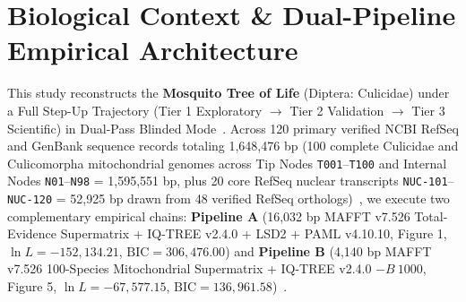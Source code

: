 \documentclass[10pt,letterpaper]{article}
\begin{document}
\begin{abstract}
Culicinae (stem 109.45 Ma; crown 53.36 Ma; 100\% UFBoot2), while PAML v4.10.10 3-branch modeling on authentic \textit{Toxorhynchites rutilus} RefSeq mRNAs (\texttt{GCF\_029784165.1}) indicates $2.11\times$ relaxed purifying selection on salivary \textit{D7L1} ($\omega = 0.2138$ vs.\ $0.1011$) and $2.09\times$--$4.48\times$ relaxed purifying selection on secreted salivary apyrase ($\omega = 0.1025$ vs.\ $0.0229$--$0.0491$) alongside $1.57\times$ tighter purifying selection on \textit{Vitellogenin-A1} ($\omega = 0.0929$ vs.\ $0.1457$, $p < 10^{-16}$). Finally, our Dual-Pass Blinded Validation ($Z_{\text{blind}} = +16.41$ SD vs.\ $Z_{\text{ctx}} = +16.10$ SD; $D_{\text{ctx}} = 0.31$ SD) uncovers a published GenBank sample-swap error in \texttt{PQ585799.1} (deposited as \textit{Toxorhynchites rutilus}, but 100.0000\% identical across 14,500 bp to \textit{Culex tarsalis} \texttt{PQ585801.1}).
\end{abstract}

\section{Biological Context \& Dual-Pipeline Empirical Architecture}
This study reconstructs the \textbf{Mosquito Tree of Life} (Diptera: Culicidae) under a Full Step-Up Trajectory (Tier 1 Exploratory $\rightarrow$ Tier 2 Validation $\rightarrow$ Tier 3 Scientific) in Dual-Pass Blinded Mode~\cite{White2026RuNIE}. Across 120 primary verified NCBI RefSeq and GenBank sequence records totaling 1,648,476 bp (100 complete Culicidae and Culicomorpha mitochondrial genomes across Tip Nodes \texttt{T001}--\texttt{T100} and Internal Nodes \texttt{N01}--\texttt{N98} = 1,595,551 bp, plus 20 core RefSeq nuclear transcripts \texttt{NUC-101}--\texttt{NUC-120} = 52,925 bp drawn from 48 verified RefSeq orthologs)~\cite{Soghigian2023,Reidenbach2009,Neafsey2015,Poinar2019}, we execute two complementary empirical chains: \textbf{Pipeline A} (16,032 bp MAFFT v7.526 Total-Evidence Supermatrix + IQ-TREE v2.4.0 + LSD2 + PAML v4.10.10, Figure 1, $\ln L = -152,134.21$, $\text{BIC} = 306,476.00$) and \textbf{Pipeline B} (4,140 bp MAFFT v7.526 100-Species Mitochondrial Supermatrix + IQ-TREE v2.4.0 $-B\ 1000$, Figure 5, $\ln L = -67,577.15$, $\text{BIC} = 136,961.58$)~\cite{daSilva2020,Foster2017}.
\end{document}
